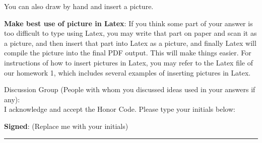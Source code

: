 \documentclass[12pt]{article}
\begin{document}
You can also draw by hand and insert a picture.

\vspace{.5cm}

\textbf{Make best use of picture in Latex}: If you think some part of your answer is too difficult to type using Latex, you may write that part on paper and scan it as a picture, and then insert that part into Latex as a picture, and finally Latex will compile the picture into the final PDF output. This will make things easier. For instructions of how to insert pictures in Latex, you may refer to the Latex file of our homework 1, which includes several examples of inserting pictures in Latex.


\hrulefill

Discussion Group (People with whom you discussed ideas used in your answers if any):     \\[1ex]


I acknowledge and accept the Honor Code. Please type your initials below:

\textbf{Signed}: ({\color{blue}Replace me with your initials})



\rule{\linewidth}{0.4pt}
\end{document}
